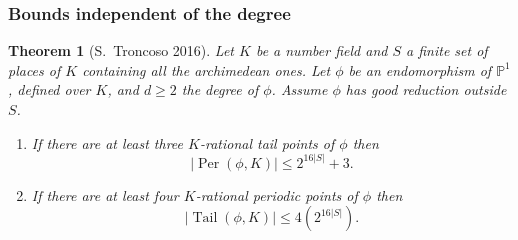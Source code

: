 \documentclass{beamer}
\def\PP{{\mathbb P}}
\def\QQ{{\mathbb Q}}
\DeclareMathOperator{\Tail}{Tail}
\DeclareMathOperator{\Per}{Per}
\theoremstyle{thmstyle}
\newtheorem*{mythm}{Theorem}
\theoremstyle{mystyle}
\theoremstyle{qstnstyle}
\begin{document}
%
%





\begin{frame}
\frametitle{Bounds independent of the degree}
\begin{mythm}[S.\ Troncoso 2016]
Let $K$ be a number field and $S$ a finite set of places of $K$ containing all the archimedean ones. Let $\phi $ be an endomorphism of $\PP^1$, defined over $K$, and $d \geq 2$ the degree of $\phi$. Assume $\phi$ has  good reduction outside $S$.
\begin{enumerate}

\item [(a)] \label{th 3 periodic}
If there are at least three $K$-rational tail points of $\phi$ then
$$|\Per(\phi,K)| \leq 2^{16|S|}+3. $$

\item [(b)] \label{th 4 preperiodic}
If there are at least four $K$-rational periodic points of $\phi$ then
$$|\Tail(\phi,K)| \leq 4(2^{16|S|}).$$
\end{enumerate}
\end{mythm}
\end{frame}
\end{document}
